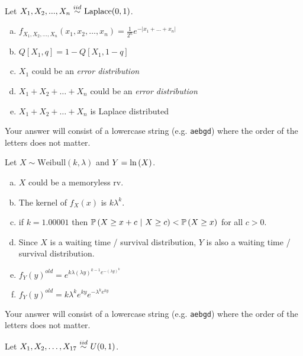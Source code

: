 \documentclass[12pt,landscape]{article}
\newcommand{\instr}{\small Your answer will consist of a lowercase string (e.g. \texttt{aebgd}) where the order of the letters does not matter. \normalsize}
\begin{document}

\problem{} Let $X_1, X_2, ..., X_n \iid \text{Laplace}(0, 1)$.

\vspace{-0.2cm}\benum{} 

\begin{enumerate}[(a)]
\item $f_{X_1, X_2, ..., X_n}(x_1, x_2, \ldots, x_n) = \frac{1}{2^n} e^{-|x_1 + \ldots + x_n|}$
\item $Q[X_1, q] = 1 - Q[X_1, 1 - q]$
\item $X_1$ could be an \emph{error distribution}
\item $X_1 + X_2 + \ldots + X_n$ could be an \emph{error distribution}
\item $X_1 + X_2 + \ldots + X_n$ is Laplace distributed
\end{enumerate}
\eenum\instr\pagebreak


\problem{} Let $X \sim \text{Weibull}(k, \lambda)$ and $Y = \ln\left(X\right)$.

\vspace{-0.2cm}\benum{} 

\begin{enumerate}[(a)]
\item $X$ could be a memoryless rv.
\item The kernel of $f_X(x)$ is $k \lambda^k$.
\item if $k = 1.00001$ then $\mathbb{P}\left(X \geq x + c~|~X \geq c\right) < \mathbb{P}\left(X \geq x\right)$ for all $c > 0$.
\item Since $X$ is a waiting time / survival distribution, $Y$ is also a waiting time / survival distribution.
\item $f_Y(y)^{old} = e^{k\lambda (\lambda y)^{k-1} e^{-(\lambda y)^k}}$
\item $f_Y(y)^{old} = k\lambda^k e^{ky} e^{-\lambda^k e^{ky}}$
\end{enumerate}
\eenum\instr\pagebreak


\problem{} Let $X_1, X_2, \ldots, X_{17} \iid U(0, 1)$.

\vspace{-0.2cm}\benum{} 
\end{document}
